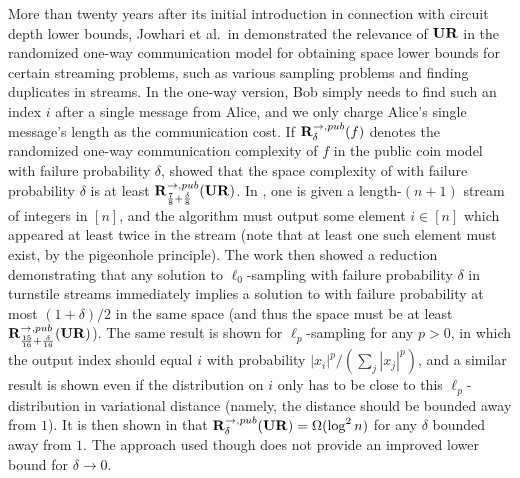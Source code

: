 
More than twenty years after its initial introduction in connection with circuit depth lower bounds, Jowhari et al.\ in \cite{JowhariST11} demonstrated the relevance of $\mathbf{UR}$ in the randomized one-way communication model for obtaining space lower bounds for certain streaming problems, such as various sampling problems and finding duplicates in streams. In the one-way version, Bob simply needs to find such an index $i$ after a single message from Alice, and we only charge Alice's single message's length as the communication cost. If $\mathbf{R}^{\rightarrow,pub}_\delta(f)$ denotes the randomized one-way communication complexity of $f$ in the public coin model with failure probability $\delta$, \cite{JowhariST11} showed that the space complexity of  with failure probability $\delta$ is at least $\mathbf{R}^{\rightarrow,pub}_{\frac 78 + \frac{\delta}8}(\mathbf{UR})$. In , one is given a length-$(n+1)$ stream of integers in $[n]$, and the algorithm must output some element $i\in[n]$ which appeared at least twice in the stream (note that at least one such element must exist, by the pigeonhole principle). The work \cite{JowhariST11} then showed a reduction demonstrating that any solution to $\ell_0$-sampling with failure probability $\delta$ in turnstile streams immediately implies a solution to  with failure probability at most $(1+\delta)/2$ in the same space (and thus the space must be at least $\mathbf{R}^{\rightarrow,pub}_{\frac{15}{16} + \frac{\delta}{16}}(\mathbf{UR})$). The same result is shown for $\ell_p$-sampling for any $p>0$, in which the output index should equal $i$ with probability $|x_i|^p/(\sum_j |x_j|^p)$, and a similar result is shown even if the distribution on $i$ only has to be close to this $\ell_p$-distribution in variational distance (namely, the distance should be bounded away from $1$). It is then shown in \cite{JowhariST11} that $\mathbf{R}^{\rightarrow,pub}_\delta(\mathbf{UR}) = \Omega(\log^2 n)$ for any $\delta$ bounded away from $1$. The approach used though does not provide an improved lower bound for $\delta\rightarrow 0$.

